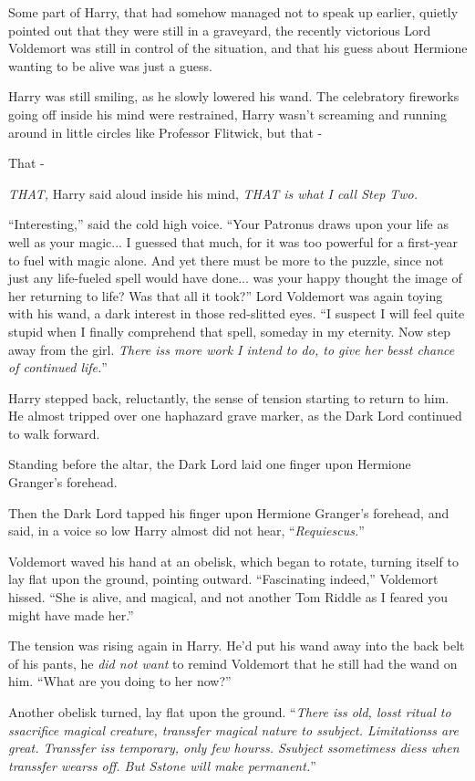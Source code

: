 Some part of Harry, that had somehow managed not to speak up earlier, quietly pointed out that they were still in a graveyard, the recently victorious Lord Voldemort was still in control of the situation, and that his guess about Hermione wanting to be alive was just a guess.

Harry was still smiling, as he slowly lowered his wand. The celebratory fireworks going off inside his mind were restrained, Harry wasn't screaming and running around in little circles like Professor Flitwick, but that -

That -

\emph{THAT,} Harry said aloud inside his mind, \emph{THAT is what I call Step Two.}

``Interesting,'' said the cold high voice. ``Your Patronus draws upon your life as well as your magic... I guessed that much, for it was too powerful for a first-year to fuel with magic alone. And yet there must be more to the puzzle, since not just any life-fueled spell would have done... was your happy thought the image of her returning to life? Was that all it took?'' Lord Voldemort was again toying with his wand, a dark interest in those red-slitted eyes. ``I suspect I will feel quite stupid when I finally comprehend that spell, someday in my eternity. Now step away from the girl. \emph{There iss more work I intend to do, to give her besst chance of continued life.}''

Harry stepped back, reluctantly, the sense of tension starting to return to him. He almost tripped over one haphazard grave marker, as the Dark Lord continued to walk forward.

Standing before the altar, the Dark Lord laid one finger upon Hermione Granger's forehead.

Then the Dark Lord tapped his finger upon Hermione Granger's forehead, and said, in a voice so low Harry almost did not hear, ``\emph{Requiescus.}''

Voldemort waved his hand at an obelisk, which began to rotate, turning itself to lay flat upon the ground, pointing outward. ``Fascinating indeed,'' Voldemort hissed. ``She is alive, and magical, and not another Tom Riddle as I feared you might have made her.''

The tension was rising again in Harry. He'd put his wand away into the back belt of his pants, he \emph{did not want} to remind Voldemort that he still had the wand on him. ``What are you doing to her now?''

Another obelisk turned, lay flat upon the ground. ``\emph{There iss old, losst ritual to ssacrifice magical creature, transsfer magical nature to ssubject. Limitationss are great. Transsfer iss temporary, only few hourss. Ssubject ssometimess diess when transsfer wearss off. But Sstone will make permanent.}''

